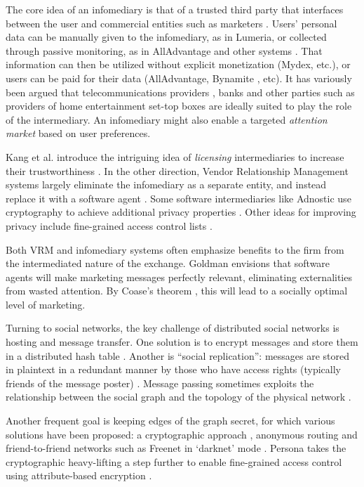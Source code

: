 \documentclass{acm_proc_article-sp}
\begin{document}
The core idea of an infomediary is that of a trusted third party that interfaces between the user and commercial entities such as marketers \cite{networth}. Users' personal data can be manually given to the infomediary, as in Lumeria, or collected through passive monitoring, as in AllAdvantage and other systems \cite{givens}.  That information can then be utilized without explicit monetization (Mydex, etc.), or users can be paid for their data (AllAdvantage, Bynamite \cite{bynamite}, etc).  It has variously been argued that telecommunications providers \cite{vodafone, ayres}, banks \cite{SWIFTDAG} and other parties such as providers of home entertainment set-top boxes are ideally suited to play the role of the intermediary.  An infomediary might also enable a targeted \emph{attention market} \cite{AllAdvantage} based on user preferences.

Kang et al. introduce the intriguing idea of \emph{licensing} intermediaries to increase their trustworthiness \cite{Kang_2010}. In the other direction, Vendor Relationship Management systems largely eliminate the infomediary as a separate entity, and instead replace it with a software agent \cite{Mitchell_Henderson_Searls_2008}. Some software intermediaries like Adnostic use cryptography to achieve additional privacy properties \cite{adnostic:privacy}. Other ideas for improving privacy include fine-grained access control lists \cite{mun2010personal}.

Both VRM and infomediary systems often emphasize benefits to the firm from the intermediated nature of the exchange. Goldman \cite{goldman_2006} envisions that software agents  will make marketing messages perfectly relevant, eliminating externalities from wasted attention. By Coase's theorem \cite{coase}, this will lead to a socially optimal level of marketing. 

Turning to social networks, the key challenge of distributed social networks is hosting and message transfer. One solution is to encrypt messages and store them in a distributed hash table \cite{buchegger:peerson, Aiello_Ruffo_2010}. Another is ``social replication'': messages are stored in plaintext in a redundant manner by those who have access rights (typically friends of the message poster) \cite{socialreplication}. Message passing sometimes exploits the relationship between the social graph and the topology of the physical network \cite{socialbutterfly, buchegger:peerson}.

Another frequent goal is keeping edges of the graph secret, for which various solutions have been proposed: a cryptographic approach \cite{backes}, anonymous routing \cite{Cutillo_Molva_Strufe_2009} and friend-to-friend networks such as Freenet in `darknet' mode \cite{Clarke_Miller_Hong_Sandberg_Wiley_2002}. Persona 
takes the cryptographic heavy-lifting a step further to enable fine-grained access control using attribute-based encryption \cite{persona}.
\end{document}
